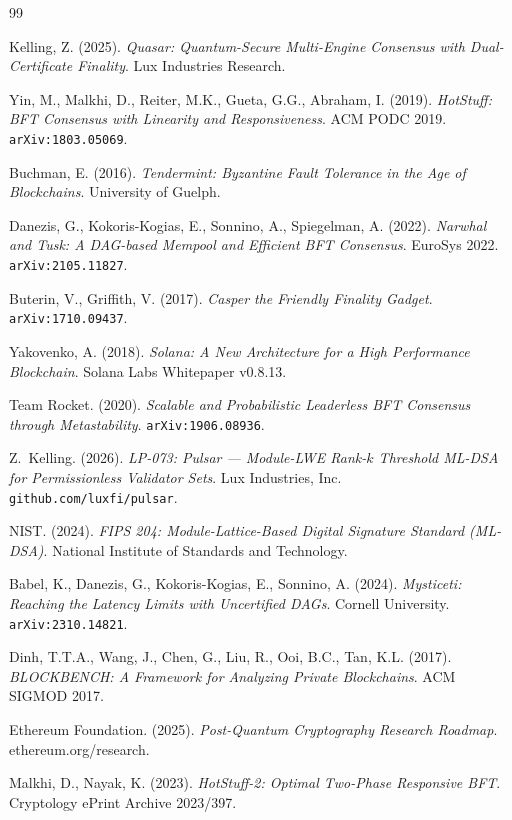 \begin{thebibliography}{99}

Kelling, Z. (2025).
\textit{Quasar: Quantum-Secure Multi-Engine Consensus with Dual-Certificate Finality}.
Lux Industries Research.

Yin, M., Malkhi, D., Reiter, M.K., Gueta, G.G., Abraham, I. (2019).
\textit{HotStuff: BFT Consensus with Linearity and Responsiveness}.
ACM PODC 2019. \texttt{arXiv:1803.05069}.

Buchman, E. (2016).
\textit{Tendermint: Byzantine Fault Tolerance in the Age of Blockchains}.
University of Guelph.

Danezis, G., Kokoris-Kogias, E., Sonnino, A., Spiegelman, A. (2022).
\textit{Narwhal and Tusk: A DAG-based Mempool and Efficient BFT Consensus}.
EuroSys 2022. \texttt{arXiv:2105.11827}.

Buterin, V., Griffith, V. (2017).
\textit{Casper the Friendly Finality Gadget}.
\texttt{arXiv:1710.09437}.

Yakovenko, A. (2018).
\textit{Solana: A New Architecture for a High Performance Blockchain}.
Solana Labs Whitepaper v0.8.13.

Team Rocket. (2020).
\textit{Scalable and Probabilistic Leaderless BFT Consensus through Metastability}.
\texttt{arXiv:1906.08936}.

Z.~Kelling. (2026).
\textit{LP-073: Pulsar --- Module-LWE Rank-$k$ Threshold ML-DSA for
Permissionless Validator Sets}.
Lux Industries, Inc. \texttt{github.com/luxfi/pulsar}.

NIST. (2024).
\textit{FIPS 204: Module-Lattice-Based Digital Signature Standard (ML-DSA)}.
National Institute of Standards and Technology.

Babel, K., Danezis, G., Kokoris-Kogias, E., Sonnino, A. (2024).
\textit{Mysticeti: Reaching the Latency Limits with Uncertified DAGs}.
Cornell University. \texttt{arXiv:2310.14821}.

Dinh, T.T.A., Wang, J., Chen, G., Liu, R., Ooi, B.C., Tan, K.L. (2017).
\textit{BLOCKBENCH: A Framework for Analyzing Private Blockchains}.
ACM SIGMOD 2017.

Ethereum Foundation. (2025).
\textit{Post-Quantum Cryptography Research Roadmap}.
ethereum.org/research.

Malkhi, D., Nayak, K. (2023).
\textit{HotStuff-2: Optimal Two-Phase Responsive BFT}.
Cryptology ePrint Archive 2023/397.


\end{thebibliography}
